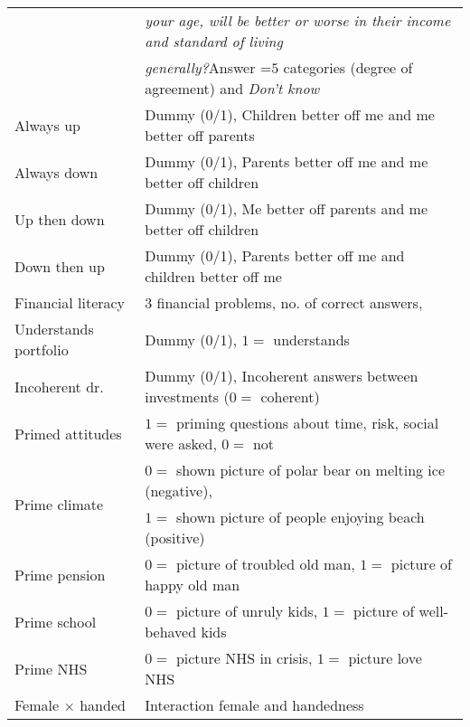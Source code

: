 \documentclass[a4paper,12pt]{article}
\begin{document}
{\begin{threeparttable}
\begin{small}
\begin{tabular}{ll}
&\textit{your age, will be better or worse in their income and standard of living}\\
\vspace{0.14cm}& \textit{generally?}Answer =$5$ categories (degree of agreement) and \textit{Don't know}\\
\vspace{0.14cm}Always up&Dummy (0/1), Children better off me and me better off parents\\
\vspace{0.14cm}Always down&Dummy (0/1), Parents better off me and me better off children\\
\vspace{0.14cm}Up then down&Dummy (0/1), Me better off parents and me better off children\\
\vspace{0.14cm}Down then up&Dummy (0/1), Parents better off me and children better off me\\
\vspace{0.14cm}Financial literacy&$3$ financial problems, no. of correct answers, \citet{lusardi2014}\\
\vspace{0.14cm}Understands portfolio&Dummy (0/1), $1=$ understands\\
\vspace{0.14cm}Incoherent dr.&Dummy (0/1), Incoherent answers between investments ($0=$ coherent)\\
\vspace{0.14cm}Primed attitudes&$1=$ priming questions about time, risk, social were asked, $0=$ not\\
\multirow{2}{*}{Prime climate}&$0=$ shown picture of polar bear on melting ice (negative),\\
\vspace{0.14cm}& $1=$ shown picture of people enjoying beach (positive)\\
\vspace{0.14cm}Prime pension&$0=$ picture of troubled old man, $1=$ picture of happy old man\\
\vspace{0.14cm}Prime school&$0=$ picture of unruly kids, $1=$ picture of well-behaved kids\\
\vspace{0.14cm}Prime NHS&$0=$ picture NHS in crisis, $1=$ picture love NHS\\
\vspace{0.14cm}Female $\times$ handed &Interaction female and handedness\\

\end{tabular}
\end{small}
\end{threeparttable}}
\end{document}
